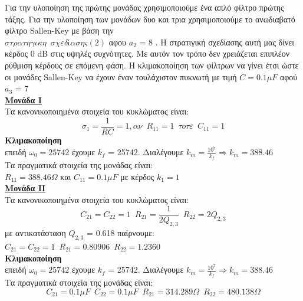 \documentclass{article}
\begin{document}
{{Για την υλοποίηση της πρώτης μονάδας χρησιμοποιούμε ένα απλό φίλτρο πρώτης τάξης. Για την υλοποίηση των μονάδων δυο και τρια χρησιμοποιούμε το ανωδιαβατό φίλτρο Sallen-Key με βάση την  \\$\boxed{στρατηγικη \enspace σχεδίασης (2)}$ αφου $a_2$ = 8 . Η στρατιγική σχεδίασης αυτή μας δίνει κέρδος 0 dB στις υψηλές συχνότητες. Με αυτόν τον τρόπο δεν χρειάζεται επιπλέον ρύθμιση κέρδους σε επόμενη φάση.
Η κλιμακοποίηση των φίλτρων να γίνει έτσι ώστε οι μονάδες
Sallen-Key
να έχουν έναν τουλάχιστον πυκνωτή με τιμή $\boxed{C = 0.1μF}$ αφού $a_3$ = 7
\\[0.4\baselineskip]
\large{ \underline{\textbf{Μονάδα Ι}} \\[0.4\baselineskip]}
\large{}
Τα κανονικοποιημένα στοιχεία του κυκλώματος είναι:
\begin{equation*}
σ_1 = \frac{1}{RC} = 1, αν \enspace \boxed{R_{11} = 1} \enspace τοτε \enspace \boxed{C_{11} = 1}
\end{equation*}
\large{{\textbf{Κλιμακοποίηση}} \\[0.4\baselineskip]}
\large{}
επειδή $ω_0= 25742$ έχουμε $k_f$ = 25742. Διαλέγουμε $k_m = \frac{10^7}{k_f}\Rightarrow k_m=388.46$  \\
Τα πραγματικά στοιχεία της μονάδας είναι: \\ $\boxed{R_{11} = 388.46Ω}$ και $\boxed{C_{11} = 0.1μF}$ 
με κέρδος $\boxed{k_1 = 1}$
\\[0.4\baselineskip]
\large{ \underline{\textbf{Μονάδα ΙI}} \\[0.4\baselineskip]}
\large{}
Τα κανονικοποιημένα στοιχεία του κυκλώματος είναι:
\begin{equation*}
C_{21} = C_{22} = 1 \enspace R_{21} = \frac{1}{2Q_{2,3}} \enspace R_{22} = 2Q_{2,3}
\end{equation*}
με αντικατάσταση $Q_{2,3}$ = 0.618 παίρνουμε: \\ 
$\boxed{C_{21} = C_{22} = 1} \enspace \boxed{R_{21} =0.80906} \enspace \boxed{
R_{22} =  1.2360}$ \\[0.4\baselineskip]
\large{{\textbf{Κλιμακοποίηση}} \\[0.4\baselineskip]}
\large{}
επειδή $ω_0= 25742$ έχουμε $k_f$ = 25742. Διαλέγουμε $k_m = \frac{10^7}{k_f}\Rightarrow k_m=388.46$ \\
Τα πραγματικά στοιχεία της μονάδας είναι:
\begin{equation*}
\boxed{C_{21} = 0.1μF} \enspace \boxed{C_{22} = 0.1μF} \enspace \boxed{R_{21}=314.289 Ω} \enspace \boxed{R_{22} = 480.138 Ω}
\end{equation*} 
}}
\end{document}
